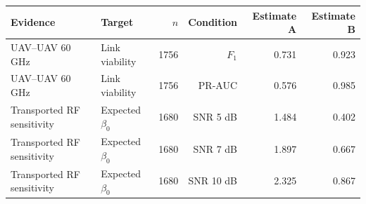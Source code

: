 \begin{tabular}{llrrrr}
\toprule
Evidence & Target & $n$ & Condition & Estimate A & Estimate B \\
\midrule
UAV--UAV 60 GHz & Link viability & 1756 & $F_1$ & 0.731 & 0.923 \\
UAV--UAV 60 GHz & Link viability & 1756 & PR-AUC & 0.576 & 0.985 \\
Transported RF sensitivity & Expected $\beta_0$ & 1680 & SNR 5 dB & 1.484 & 0.402 \\
Transported RF sensitivity & Expected $\beta_0$ & 1680 & SNR 7 dB & 1.897 & 0.667 \\
Transported RF sensitivity & Expected $\beta_0$ & 1680 & SNR 10 dB & 2.325 & 0.867 \\
\bottomrule
\end{tabular}
